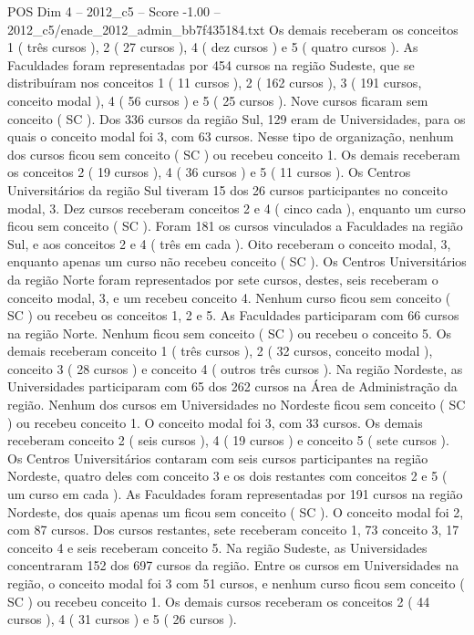 \begin{textsample}{POS Dim 4 – 2012\_c5 – Score -1.00 – 2012\_c5/enade\_2012\_admin\_bb7f435184.txt}
Os demais receberam os conceitos 1 ( três cursos ), 2 ( 27 cursos ), 4 ( dez cursos ) e 5 ( quatro cursos ).
As Faculdades foram representadas por 454 cursos na região Sudeste, que se distribuíram nos conceitos 1 ( 11 cursos ), 2 ( 162 cursos ), 3 ( 191 cursos, conceito modal ), 4 ( 56 cursos ) e 5 ( 25 cursos ).
Nove cursos ficaram sem conceito ( SC ).
Dos 336 cursos da região Sul, 129 eram de Universidades, para os quais o conceito modal foi 3, com 63 cursos.
Nesse tipo de organização, nenhum dos cursos ficou sem conceito ( SC ) ou recebeu conceito 1.
Os demais receberam os conceitos 2 ( 19 cursos ), 4 ( 36 cursos ) e 5 ( 11 cursos ).
Os Centros Universitários da região Sul tiveram 15 dos 26 cursos participantes no conceito modal, 3.
Dez cursos receberam conceitos 2 e 4 ( cinco cada ), enquanto um curso ficou sem conceito ( SC ).
Foram 181 os cursos vinculados a Faculdades na região Sul, e aos conceitos 2 e 4 ( três em cada ).
Oito receberam o conceito modal, 3, enquanto apenas um curso não recebeu conceito ( SC ).
Os Centros Universitários da região Norte foram representados por sete cursos, destes, seis receberam o conceito modal, 3, e um recebeu conceito 4.
Nenhum curso ficou sem conceito ( SC ) ou recebeu os conceitos 1, 2 e 5.
As Faculdades participaram com 66 cursos na região Norte.
Nenhum ficou sem conceito ( SC ) ou recebeu o conceito 5.
Os demais receberam conceito 1 ( três cursos ), 2 ( 32 cursos, conceito modal ), conceito 3 ( 28 cursos ) e conceito 4 ( outros três cursos ).
Na região Nordeste, as Universidades participaram com 65 dos 262 cursos na Área de Administração da região.
Nenhum dos cursos em Universidades no Nordeste ficou sem conceito ( SC ) ou recebeu conceito 1.
O conceito modal foi 3, com 33 cursos.
Os demais receberam conceito 2 ( seis cursos ), 4 ( 19 cursos ) e conceito 5 ( sete cursos ).
Os Centros Universitários contaram com seis cursos participantes na região Nordeste, quatro deles com conceito 3 e os dois restantes com conceitos 2 e 5 ( um curso em cada ).
As Faculdades foram representadas por 191 cursos na região Nordeste, dos quais apenas um ficou sem conceito ( SC ).
O conceito modal foi 2, com 87 cursos.
Dos cursos restantes, sete receberam conceito 1, 73 conceito 3, 17 conceito 4 e seis receberam conceito 5.
Na região Sudeste, as Universidades concentraram 152 dos 697 cursos da região.
Entre os cursos em Universidades na região, o conceito modal foi 3 com 51 cursos, e nenhum curso ficou sem conceito ( SC ) ou recebeu conceito 1.
Os demais cursos receberam os conceitos 2 ( 44 cursos ), 4 ( 31 cursos ) e 5 ( 26 cursos ).

\end{textsample}
